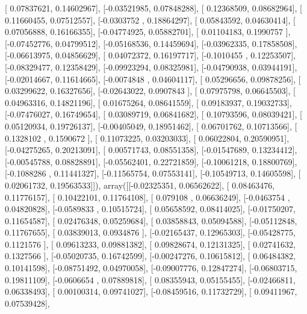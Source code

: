 \documentclass{article}
\begin{document}
       [ 0.07837621,  0.14602967],
       [-0.03521985,  0.07848288],
       [ 0.12368509,  0.08682964],
       [ 0.11660455,  0.07512557],
       [-0.0303752 ,  0.18864297],
       [ 0.05843592,  0.04630414],
       [ 0.07056888,  0.16166355],
       [-0.04774925,  0.05882701],
       [ 0.01104183,  0.1990757 ],
       [-0.07452776,  0.04799512],
       [-0.05168536,  0.14459694],
       [-0.03962335,  0.17858508],
       [-0.06613975,  0.04856629],
       [ 0.04072372,  0.16197717],
       [-0.1010455 ,  0.12253507],
       [-0.08329477,  0.12358429],
       [-0.09923294,  0.08325981],
       [-0.04790938,  0.03944191],
       [-0.02014667,  0.11614665],
       [-0.0074848 ,  0.04604117],
       [ 0.05296656,  0.09878256],
       [ 0.03299622,  0.16327656],
       [-0.02643022,  0.0907843 ],
       [ 0.07975798,  0.06645503],
       [ 0.04963316,  0.14821196],
       [ 0.01675264,  0.08641559],
       [ 0.09183937,  0.19032733],
       [-0.07476027,  0.16749654],
       [ 0.03089719,  0.06841682],
       [ 0.10793596,  0.08039421],
       [ 0.05120934,  0.19726137],
       [-0.00405049,  0.18951462],
       [ 0.06701762,  0.10713566],
       [ 0.1328102 ,  0.1590672 ],
       [ 0.11073225,  0.03203033],
       [ 0.06022804,  0.20590951],
       [-0.04275265,  0.20213091],
       [ 0.00571743,  0.08551358],
       [-0.01547689,  0.13234412],
       [-0.00545788,  0.08828891],
       [-0.05562401,  0.22721859],
       [-0.10061218,  0.18800769],
       [-0.1088286 ,  0.11441327],
       [-0.11565754,  0.07553141],
       [-0.10549713,  0.14605598],
       [ 0.02061732,  0.19563533]]), array([[-0.02325351,  0.06562622],
       [ 0.08463476,  0.11776157],
       [ 0.10422101,  0.11764108],
       [ 0.079108  ,  0.06636249],
       [-0.0463754 ,  0.04820828],
       [-0.0589833 ,  0.10515724],
       [ 0.05658592,  0.08414025],
       [-0.01750207,  0.11654587],
       [ 0.02476348,  0.05259684],
       [ 0.03858843,  0.05094588],
       [-0.05112848,  0.11767655],
       [ 0.03839013,  0.0934876 ],
       [-0.02165437,  0.12965303],
       [-0.05428775,  0.1121576 ],
       [ 0.09613233,  0.09881382],
       [ 0.09828674,  0.12131325],
       [ 0.02741632,  0.1327566 ],
       [-0.05020735,  0.16742599],
       [-0.00247276,  0.10615812],
       [ 0.06484382,  0.10141598],
       [-0.08751492,  0.04970058],
       [-0.09007776,  0.12847274],
       [-0.06803715,  0.19811109],
       [-0.0606654 ,  0.07889818],
       [ 0.08355943,  0.05155455],
       [-0.02466811,  0.06338493],
       [ 0.00100314,  0.09741027],
       [-0.08459516,  0.11732729],
       [ 0.09411967,  0.07539428],
\end{document}
